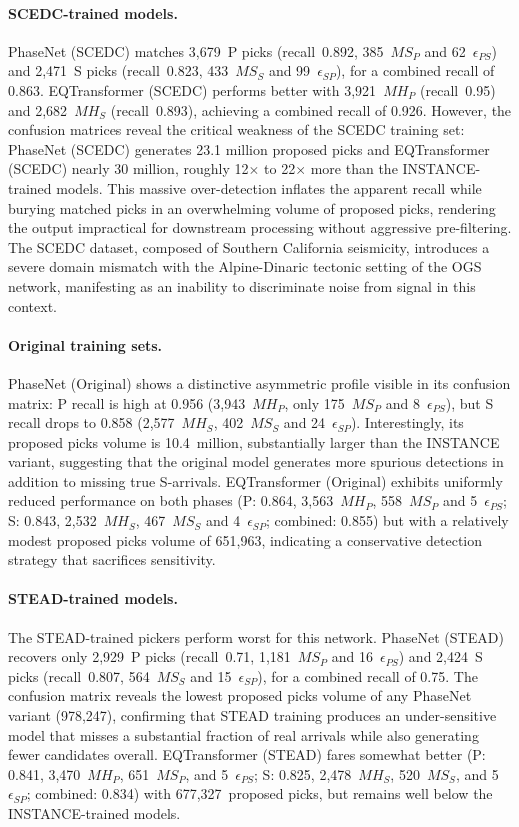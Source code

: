 \paragraph{SCEDC-trained models.}
PhaseNet (SCEDC) matches 3,679~P picks (recall~0.892, 385~$MS_P$ and
62~$\epsilon_{PS}$) and 2,471~S picks (recall~0.823, 433~$MS_S$ and
99~$\epsilon_{SP}$), for a combined recall of 0.863. EQTransformer (SCEDC)
performs better with 3,921~$MH_P$ (recall~0.95) and 2,682~$MH_S$
(recall~0.893), achieving a combined recall of 0.926. However, the confusion
matrices reveal the critical weakness of the SCEDC training set: PhaseNet
(SCEDC) generates 23.1 million proposed picks and EQTransformer (SCEDC) nearly
30 million, roughly 12$\times$ to 22$\times$ more than the INSTANCE-trained
models. This massive over-detection inflates the apparent recall while burying
matched picks in an overwhelming volume of proposed picks, rendering the output
impractical for downstream processing without aggressive pre-filtering. The
SCEDC dataset, composed of Southern California seismicity, introduces a severe
domain mismatch with the Alpine-Dinaric tectonic setting of the OGS network,
manifesting as an inability to discriminate noise from signal in this context.

\paragraph{Original training sets.}
PhaseNet (Original) shows a distinctive asymmetric profile visible in its
confusion matrix: P recall is high at 0.956 (3,943~$MH_P$, only 175~$MS_P$ and
8~$\epsilon_{PS}$), but S recall drops to 0.858 (2,577~$MH_S$, 402~$MS_S$ and
24~$\epsilon_{SP}$). Interestingly, its proposed picks volume is 10.4~million,
substantially larger than the INSTANCE variant, suggesting that the original
model generates more spurious detections in addition to missing true
S-arrivals. EQTransformer (Original) exhibits uniformly reduced performance on
both phases (P: 0.864, 3,563~$MH_P$, 558~$MS_P$ and 5~$\epsilon_{PS}$; S:
0.843, 2,532~$MH_S$, 467~$MS_S$ and 4~$\epsilon_{SP}$; combined: 0.855) but
with a relatively modest proposed picks volume of 651,963, indicating a
conservative detection strategy that sacrifices sensitivity.

\paragraph{STEAD-trained models.}
The STEAD-trained pickers perform worst for this network. PhaseNet (STEAD)
recovers only 2,929~P picks (recall~0.71, 1,181~$MS_P$ and 16~$\epsilon_{PS}$)
and 2,424~S picks (recall~0.807, 564~$MS_S$ and 15~$\epsilon_{SP}$), for a
combined recall of 0.75. The confusion matrix reveals the lowest proposed picks
volume of any PhaseNet variant (978,247), confirming that STEAD training
produces an under-sensitive model that misses a substantial fraction of real
arrivals while also generating fewer candidates overall. EQTransformer (STEAD)
fares somewhat better (P: 0.841, 3,470~$MH_P$, 651~$MS_P$, and
  5~$\epsilon_{PS}$; S: 0.825, 2,478~$MH_S$, 520~$MS_S$, and 5~$\epsilon_{SP}$;
combined: 0.834) with 677,327~proposed picks, but remains well below the
INSTANCE-trained models.\\

